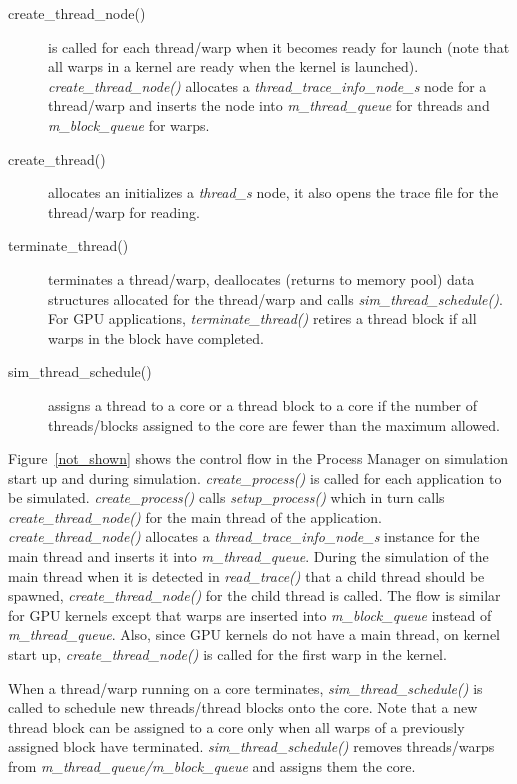 \begin{description}
\begin{description}
\item [create\_thread\_node()] is called for each thread/warp when it becomes
ready for launch (note that all warps in a kernel are ready when the kernel is
    launched). \textit{create\_thread\_node()} allocates a
\textit{thread\_trace\_info\_node\_s} node for a thread/warp and inserts the
node into \textit{m\_thread\_queue} for threads and \textit{m\_block\_queue}
for warps.

\item [create\_thread()] allocates an initializes a \textit{thread\_s} node, it
also opens the trace file for the thread/warp for reading.


\item [terminate\_thread()] terminates a thread/warp, deallocates (returns to
    memory pool) data structures allocated for the thread/warp and calls
\textit{sim\_thread\_schedule()}. For GPU applications,
  \textit{terminate\_thread()} retires a thread block if all warps in the block
  have completed. 


\item [sim\_thread\_schedule()] assigns a thread to a core or a thread block to
a core if the number of threads/blocks assigned to the core are fewer than the
maximum allowed.

\end{description}

\end{description}


Figure~\ref{not_shown} shows the control flow in the Process Manager on
simulation start up and during simulation. \textit{create\_process()} is called
for each application to be simulated. \textit{create\_process()} calls
\textit{setup\_process()} which in turn calls \textit{create\_thread\_node()}
for the main thread of the application. \textit{create\_thread\_node()}
allocates a \textit{thread\_trace\_info\_node\_s} instance for the main thread
and inserts it into \textit{m\_thread\_queue}. During the simulation of the
main thread when it is detected in \textit{read\_trace()} that a child thread
should be spawned, \textit{create\_thread\_node()} for the child thread is
called. The flow is similar for GPU kernels except that warps are inserted into
\textit{m\_block\_queue} instead of \textit{m\_thread\_queue}. Also, since GPU
kernels do not have a main thread, on kernel start up,
\textit{create\_thread\_node()} is called for the first warp in the
kernel. 

When a thread/warp running on a core terminates,
     \textit{sim\_thread\_schedule()} is called to schedule new threads/thread
     blocks onto the core. Note that a new thread block can be assigned to a
     core only when all warps of a previously assigned block have terminated.
     \textit{sim\_thread\_schedule()} removes threads/warps from
     \textit{m\_thread\_queue/m\_block\_queue} and assigns them the core.

